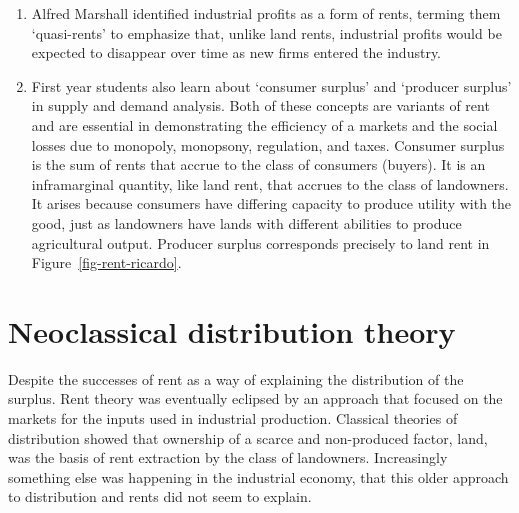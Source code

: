 \begin{enumerate}
    \item Alfred Marshall identified industrial profits as a form of rents, terming them `quasi-rents' to emphasize that, unlike land rents, industrial profits would be expected to disappear over time as new firms entered the industry.
    
    \item First year students also learn about `consumer surplus' and `producer surplus' in supply and demand analysis. Both of these concepts are variants of rent and are essential in demonstrating the efficiency of a markets and the social losses due to \gls{monopoly}, \gls{monopsony}, regulation, and taxes. Consumer surplus is the sum of rents that accrue to the class of consumers (buyers). It is an \gls{inframarginal} quantity, like land  rent, that accrues to the class of landowners. It arises because consumers have differing capacity to produce  utility with the good, just as landowners have lands with different abilities to produce agricultural output. Producer surplus corresponds precisely to land rent in Figure~\ref{fig-rent-ricardo}.  
\end{enumerate}

\section{Neoclassical distribution theory}
% 

 
Despite the successes of rent as a way of explaining the distribution of the surplus. %
Rent theory was eventually eclipsed by an approach that focused on the markets for the inputs used in industrial production. %
Classical theories of distribution showed that ownership of a scarce and non-produced factor, land, was the  basis of rent extraction by the class of landowners. Increasingly something else was happening in the industrial economy, that this older approach to distribution and rents did not seem to explain. 

